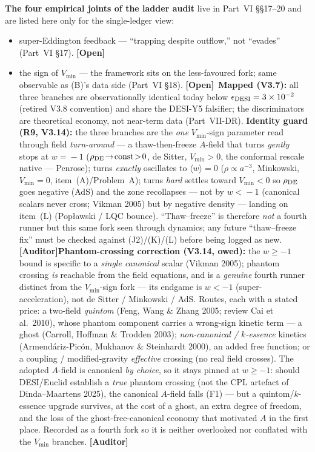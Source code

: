 \documentclass[11pt]{article}
\newcommand{\Auditor}{\textbf{\textcolor{teal!55!black}{[Auditor]}}}
\newcommand{\open}{\textcolor{red!70!black}{\textbf{[Open]}}}
\begin{document}
\textbf{The four empirical joints of the ladder audit} live in Part~VI \S\S17--20 and are listed here only for the single-ledger view:
\begin{itemize}[leftmargin=2.9em,itemsep=2pt]
\item[\textbf{(J1)}] super-Eddington feedback --- ``trapping despite outflow,'' not ``evades'' (Part~VI \S17). \open
\item[\textbf{(J2)}] the sign of $V_{\min}$ --- the framework sits on the less-favoured fork; same observable as (B)'s data side (Part~VI \S18). \open\ \textbf{Mapped (V3.7):} all three branches are observationally identical today below $\epsilon_{\rm DESI}=3\times10^{-2}$ (retired V3.8 convention) and share the DESI-Y5 falsifier; the discriminators are theoretical economy, not near-term data (Part~VII-DR). \textbf{Identity guard (R9, V3.14):} the three branches are the \emph{one} $V_{\min}$-sign parameter read through field \emph{turn-around} --- a thaw-then-freeze $A$-field that turns \emph{gently} stops at $w\!=\!-1$ ($\rho_{\rm DE}\!\to\!{\rm const}\!>\!0$, de Sitter, $V_{\min}\!>\!0$, the conformal rescale native --- Penrose); turns \emph{exactly} oscillates to $\langle w\rangle\!=\!0$ ($\rho\!\propto\!a^{-3}$, Minkowski, $V_{\min}\!=\!0$, item~(A)/Problem~A); turns \emph{hard} settles toward $V_{\min}\!<\!0$ so $\rho_{\rm DE}$ goes negative (AdS) and the zone recollapses --- not by $w\!<\!-1$ (canonical scalars never cross; Vikman 2005) but by negative density --- landing on item~(L) (Pop\l awski / LQC bounce). ``Thaw--freeze'' is therefore \emph{not} a fourth runner but this same fork seen through dynamics; any future ``thaw--freeze fix'' must be checked against (J2)/(K)/(L) before being logged as new. \Auditor \textbf{Phantom-crossing correction (V3.14, owed):} the $w\ge-1$ bound is specific to a \emph{single canonical} scalar (Vikman 2005); phantom crossing \emph{is} reachable from the field equations, and is a \emph{genuine} fourth runner distinct from the $V_{\min}$-sign fork --- its endgame is $w<-1$ (super-acceleration), not de Sitter / Minkowski / AdS. Routes, each with a stated price: a two-field \emph{quintom} (Feng, Wang \& Zhang 2005; review Cai et al.\ 2010), whose phantom component carries a wrong-sign kinetic term --- a ghost (Carroll, Hoffman \& Trodden 2003); \emph{non-canonical / $k$-essence} kinetics (Armend\'ariz-Pic\'on, Mukhanov \& Steinhardt 2000), an added free function; or a coupling / modified-gravity \emph{effective} crossing (no real field crosses). The adopted $A$-field is canonical \emph{by choice}, so it stays pinned at $w\ge-1$: should DESI/Euclid establish a \emph{true} phantom crossing (not the CPL artefact of Dinda--Maartens 2025), the canonical $A$-field falls (F1) --- but a quintom/$k$-essence upgrade survives, at the cost of a ghost, an extra degree of freedom, and the loss of the ghost-free-canonical economy that motivated $A$ in the first place. Recorded as a fourth fork so it is neither overlooked nor conflated with the $V_{\min}$ branches. \Auditor

\end{itemize}
\end{document}
